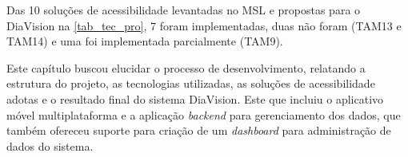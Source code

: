 Das 10 soluções de acessibilidade levantadas no MSL e propostas para o DiaVision na \autoref{tab_tec_pro},
7 foram implementadas, duas não foram (TAM13 e TAM14) e uma foi implementada parcialmente (TAM9).

Este capítulo buscou elucidar o processo de desenvolvimento, relatando a estrutura do projeto, as tecnologias
utilizadas, as soluções de acessibilidade adotas e o resultado final do sistema DiaVision. Este que incluiu o
aplicativo móvel multiplataforma e a aplicação \emph{backend} para gerenciamento dos dados, que também ofereceu
suporte para criação de um \emph{dashboard} para administração de dados do sistema.
